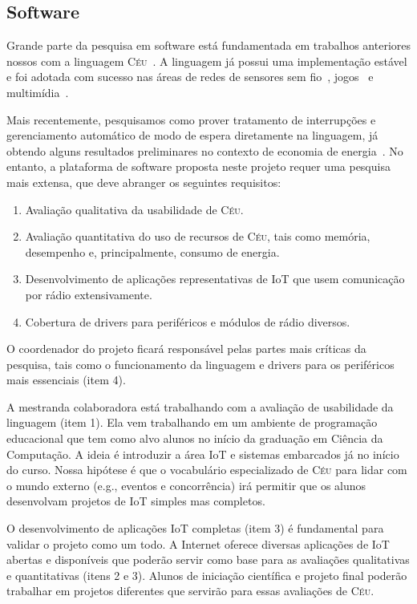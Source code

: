 \documentclass[titlepage,12pt]{article}
\newcommand{\CEU}{\textsc{C\'{e}u}\xspace}
\begin{document}
\subsection{Software}

Grande parte da pesquisa em software está fundamentada em trabalhos anteriores
nossos com a linguagem \CEU~\cite{ceu.sensys13,ceu.tecs17,ceu.lctes18}.
A linguagem já possui uma implementação estável e foi adotada com sucesso nas
áreas de redes de sensores sem fio~\cite{ceu.sensys13,ceu.terra},
jogos~\cite{ceu.mod15} e multimídia~\cite{ceumedia.webmedia16}.

Mais recentemente, pesquisamos como prover tratamento de interrupções e
gerenciamento automático de modo de espera diretamente na linguagem, já obtendo
alguns resultados preliminares no contexto de economia de
energia~\cite{ceu.lctes18.short}.
%
No entanto, a plataforma de software proposta neste projeto requer uma pesquisa
mais extensa, que deve abranger os seguintes requisitos:
%
\begin{enumerate}
\item Avaliação qualitativa da usabilidade de \CEU.
\item Avaliação quantitativa do uso de recursos de \CEU, tais como memória,
      desempenho e, principalmente, consumo de energia.
\item Desenvolvimento de aplicações representativas de IoT que usem comunicação
      por rádio extensivamente.
\item Cobertura de drivers para periféricos e módulos de rádio diversos.
\end{enumerate}

O coordenador do projeto ficará responsável pelas partes mais críticas da
pesquisa, tais como o funcionamento da linguagem e drivers para os periféricos
mais essenciais (item 4).

A mestranda colaboradora está trabalhando com a avaliação de usabilidade da
linguagem (item 1).
Ela vem trabalhando em um ambiente de programação educacional que tem como alvo
alunos no início da graduação em Ciência da Computação.
A ideia é introduzir a área IoT e sistemas embarcados já no início do curso.
Nossa hipótese é que o vocabulário especializado de \CEU para lidar com o mundo
externo (e.g., eventos e concorrência) irá permitir que os alunos desenvolvam
projetos de IoT simples mas completos.

O desenvolvimento de aplicações IoT completas (item 3) é fundamental para
validar o projeto como um todo.
A Internet oferece diversas aplicações de IoT abertas e disponíveis que poderão
servir como base para as avaliações qualitativas e quantitativas (itens 2 e 3).
Alunos de iniciação científica e projeto final poderão trabalhar em projetos
diferentes que servirão para essas avaliações de \CEU.
\end{document}
